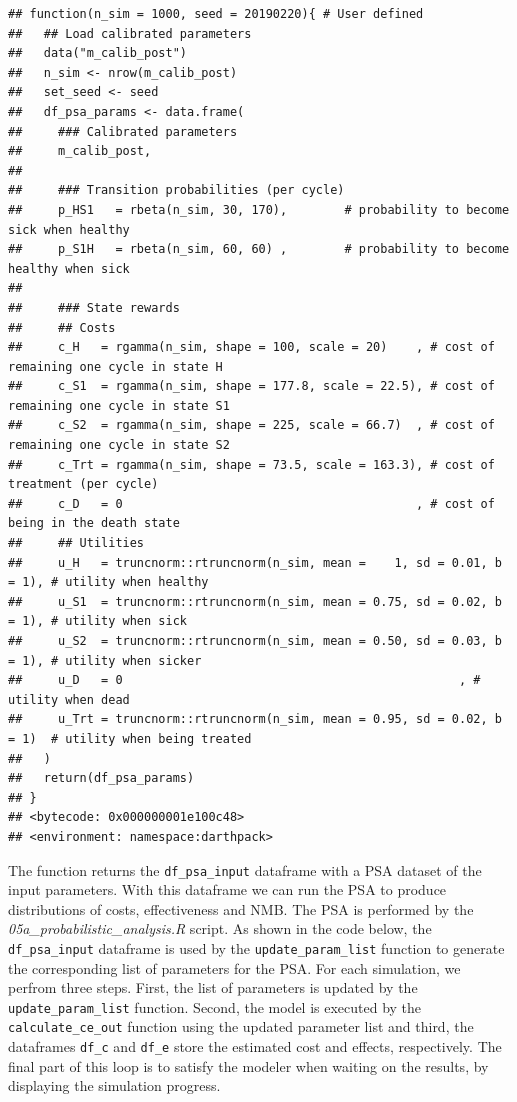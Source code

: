 \documentclass[]{book}
\begin{document}
\begin{verbatim}
## function(n_sim = 1000, seed = 20190220){ # User defined
##   ## Load calibrated parameters
##   data("m_calib_post")
##   n_sim <- nrow(m_calib_post)
##   set_seed <- seed
##   df_psa_params <- data.frame(
##     ### Calibrated parameters
##     m_calib_post,
##     
##     ### Transition probabilities (per cycle)
##     p_HS1   = rbeta(n_sim, 30, 170),        # probability to become sick when healthy
##     p_S1H   = rbeta(n_sim, 60, 60) ,        # probability to become healthy when sick
##     
##     ### State rewards
##     ## Costs
##     c_H   = rgamma(n_sim, shape = 100, scale = 20)    , # cost of remaining one cycle in state H
##     c_S1  = rgamma(n_sim, shape = 177.8, scale = 22.5), # cost of remaining one cycle in state S1
##     c_S2  = rgamma(n_sim, shape = 225, scale = 66.7)  , # cost of remaining one cycle in state S2
##     c_Trt = rgamma(n_sim, shape = 73.5, scale = 163.3), # cost of treatment (per cycle)
##     c_D   = 0                                         , # cost of being in the death state
##     ## Utilities
##     u_H   = truncnorm::rtruncnorm(n_sim, mean =    1, sd = 0.01, b = 1), # utility when healthy
##     u_S1  = truncnorm::rtruncnorm(n_sim, mean = 0.75, sd = 0.02, b = 1), # utility when sick
##     u_S2  = truncnorm::rtruncnorm(n_sim, mean = 0.50, sd = 0.03, b = 1), # utility when sicker
##     u_D   = 0                                               , # utility when dead
##     u_Trt = truncnorm::rtruncnorm(n_sim, mean = 0.95, sd = 0.02, b = 1)  # utility when being treated
##   )
##   return(df_psa_params)
## }
## <bytecode: 0x000000001e100c48>
## <environment: namespace:darthpack>
\end{verbatim}

The function returns the \texttt{df\_psa\_input} dataframe with a PSA dataset of the input parameters. With this dataframe we can run the PSA to produce distributions of costs, effectiveness and NMB. The PSA is performed by the \emph{05a\_probabilistic\_analysis.R} script. As shown in the code below, the \texttt{df\_psa\_input} dataframe is used by the \texttt{update\_param\_list} function to generate the corresponding list of parameters for the PSA. For each simulation, we perfrom three steps. First, the list of parameters is updated by the \texttt{update\_param\_list} function. Second, the model is executed by the \texttt{calculate\_ce\_out} function using the updated parameter list and third, the dataframes \texttt{df\_c} and \texttt{df\_e} store the estimated cost and effects, respectively. The final part of this loop is to satisfy the modeler when waiting on the results, by displaying the simulation progress.
\end{document}
